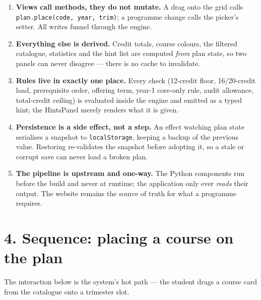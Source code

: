 \documentclass[11pt,a4paper]{article}
\begin{document}
\begin{enumerate}[leftmargin=1.5em,itemsep=3pt]
  \item \textbf{Views call methods, they do not mutate.} A drag onto the grid calls
    \texttt{plan.place(code, year, trim)}; a programme change calls the picker's setter.
    All writes funnel through the engine.
  \item \textbf{Everything else is derived.} Credit totals, course colours, the filtered
    catalogue, statistics and the hint list are computed \emph{from} plan state, so two
    panels can never disagree --- there is no cache to invalidate.
  \item \textbf{Rules live in exactly one place.} Every check (12-credit floor,
    16/20-credit load, prerequisite order, offering term, year-1 core-only rule, audit
    allowance, total-credit ceiling) is evaluated inside the engine and emitted as a
    typed hint; the HintsPanel merely renders what it is given.
  \item \textbf{Persistence is a side effect, not a step.} An effect watching plan state
    serialises a snapshot to \texttt{localStorage}, keeping a backup of the previous
    value. Restoring re-validates the snapshot before adopting it, so a stale or
    corrupt save can never load a broken plan.
  \item \textbf{The pipeline is upstream and one-way.} The Python components run before
    the build and never at runtime; the application only ever \emph{reads} their output.
    The website remains the source of truth for what a programme requires.
\end{enumerate}

\section*{4. Sequence: placing a course on the plan}

The interaction below is the system's hot path --- the student drags a course card from
the catalogue onto a trimester slot.
\end{document}
